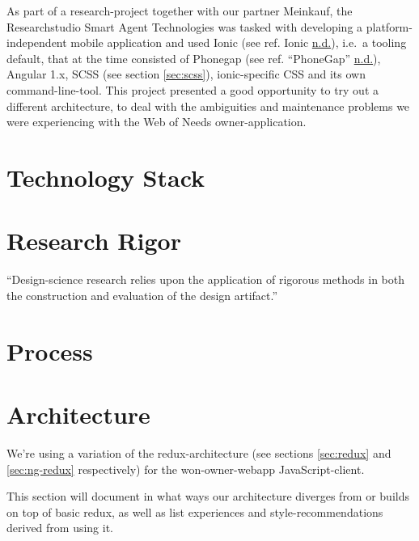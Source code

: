 \documentclass[a4paper,,tablecaptionabove]{scrbook}
\begin{document}
As part of a research-project together with our partner Meinkauf, the
Researchstudio Smart Agent Technologies was tasked with developing a
platform-independent mobile application and used Ionic (see ref. Ionic
\protect\hyperlink{ref-IonicIonicFramework}{n.d.}), i.e.~a tooling
default, that at the time consisted of Phonegap (see ref. ``PhoneGap''
\protect\hyperlink{ref-PhoneGap}{n.d.}), Angular 1.x, SCSS (see section
\ref{sec:scss}), ionic-specific CSS and its own command-line-tool. This
project presented a good opportunity to try out a different
architecture, to deal with the ambiguities and maintenance problems we
were experiencing with the Web of Needs owner-application.

\hypertarget{sec:technology-stack}{%
\section{Technology Stack}\label{sec:technology-stack}}

\hypertarget{sec:research-rigor}{%
\section{Research Rigor}\label{sec:research-rigor}}

\enquote{Design-science research relies upon the application of rigorous
methods in both the construction and evaluation of the design artifact.}

\hypertarget{sec:process}{%
\section{Process}\label{sec:process}}

\hypertarget{sec:architecture}{%
\section{Architecture}\label{sec:architecture}}

We're using a variation of the redux-architecture (see sections
\ref{sec:redux} and \ref{sec:ng-redux} respectively) for the
won-owner-webapp JavaScript-client.

This section will document in what ways our architecture diverges from
or builds on top of basic redux, as well as list experiences and
style-recommendations derived from using it.
\end{document}
